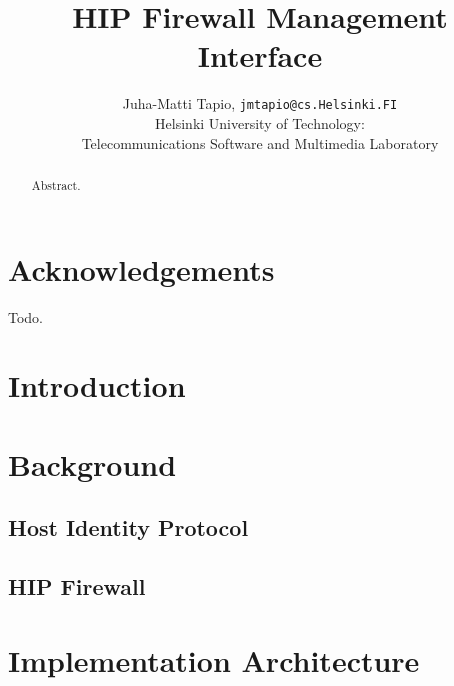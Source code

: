 \documentclass[a4paper,titlepage]{article}
\begin{document}
\title{HIP Firewall Management Interface}

\author{
        Juha-Matti Tapio, \texttt{jmtapio@cs.Helsinki.FI} \\
        Helsinki University of Technology: \\
        Telecommunications Software and Multimedia Laboratory}
\maketitle

\fancyhf{} %
\fancyfoot[C]{ \thepage }
\pagestyle{fancy}

\tableofcontents

\newpage

\section*{Acknowledgements}

Todo.

\newpage

\begin{abstract}

Abstract.

\end{abstract}

\clearpage


\section{Introduction}



\section{Background}

\subsection{Host Identity Protocol}

\subsection{HIP Firewall}



\section{Implementation Architecture}
\end{document}
